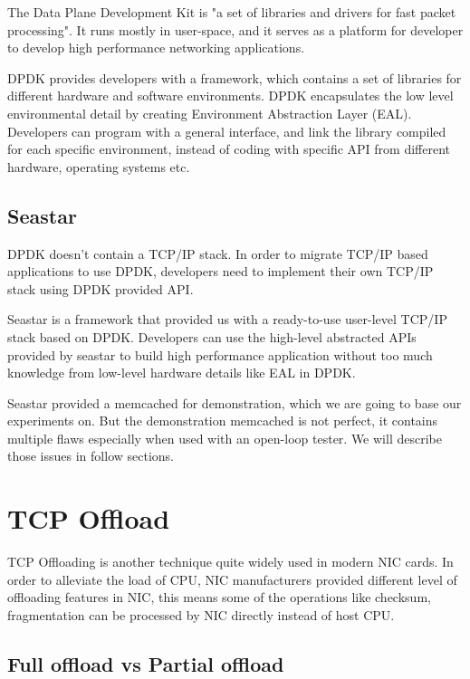 \documentclass[bsc,frontabs,twoside,singlespacing,parskip,deptreport]{infthesis}     %
\begin{document}
The Data Plane Development Kit is "a set of libraries and drivers for fast packet processing"\cite{dpdk}. It runs mostly in user-space, and it serves as a platform for developer to develop high performance networking applications.



DPDK provides developers with a framework, which contains a set of libraries for different hardware and software environments. DPDK encapsulates the low level environmental detail by creating Environment Abstraction Layer (EAL). Developers can program with a general interface, and link the library compiled for each specific environment, instead of coding with specific API from different hardware, operating systems etc.





\subsection{Seastar}
DPDK doesn't contain a TCP/IP stack. In order to migrate TCP/IP based applications to use DPDK, developers need to implement their own TCP/IP stack using DPDK provided API. 

Seastar\cite{seastar} is a framework that provided us with a ready-to-use user-level TCP/IP stack based on DPDK. Developers can use the high-level abstracted APIs provided by seastar to build high performance application without too much knowledge from low-level hardware details like EAL in DPDK.

Seastar provided a memcached for demonstration, which we are going to base our experiments on. But the demonstration memcached is not perfect, it contains multiple flaws especially when used with an open-loop tester. We will describe those issues in follow sections.



\section{TCP Offload}
TCP Offloading is another technique quite widely used in modern NIC cards. In order to alleviate the load of CPU, NIC manufacturers provided different level of offloading features in NIC, this means some of the operations like checksum, fragmentation can be processed by NIC directly instead of host CPU. 


\subsection{Full offload vs Partial offload}
\end{document}

